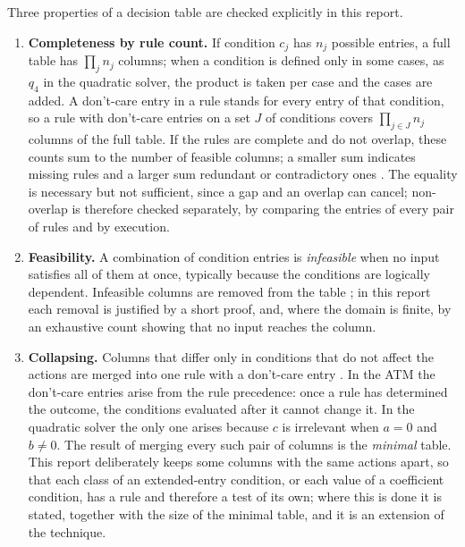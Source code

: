 \documentclass[11pt,a4paper]{article}
\begin{document}
Three properties of a decision table are checked explicitly in this report.
\begin{enumerate}[label=(\roman*)]
    \item \textbf{Completeness by rule count.} If condition \(c_j\) has
    \(n_j\) possible entries, a full table has \(\prod_j n_j\) columns; when a condition is defined only in some cases, as \(q_4\) in the quadratic solver, the product is taken per case and the cases are added. A
    don't-care entry in a rule stands for every entry of that condition, so
    a rule with don't-care entries on a set \(J\) of conditions covers
    \(\prod_{j\in J} n_j\) columns of the full table. If the rules are
    complete and do not overlap, these counts sum to the number of feasible
    columns; a smaller sum indicates missing rules and a larger sum
    redundant or contradictory ones \cite[Ch.~7]{jorgensen2021}. The
    equality is necessary but not sufficient, since a gap and an overlap can
    cancel; non-overlap is therefore checked separately, by comparing the
    entries of every pair of rules and by execution.
    \item \textbf{Feasibility.} A combination of condition entries is
    \emph{infeasible} when no input satisfies all of them at once, typically
    because the conditions are logically dependent. Infeasible columns are
    removed from the table \cite[\S4.2.3]{istqb}; in this report each removal
    is justified by a short proof, and, where the domain is finite, by an
    exhaustive count showing that no input reaches the column.
    \item \textbf{Collapsing.} Columns that differ only in conditions that do
    not affect the actions are merged into one rule with a don't-care entry
    \cite[\S4.2.3]{istqb}. In the ATM the don't-care entries arise from the
    rule precedence: once a rule has determined the outcome, the conditions
    evaluated after it cannot change it. In the quadratic solver the only
    one arises because \(c\) is irrelevant when \(a=0\) and \(b\ne0\). The result
    of merging every such pair of columns is the \emph{minimal} table. This
    report deliberately keeps some columns with the same actions apart, so
    that each class of an extended-entry condition, or each value of a
    coefficient condition, has a rule and therefore a test of its own; where
    this is done it is stated, together with the size of the minimal table,
    and it is an extension of the technique.
\end{enumerate}
\end{document}
